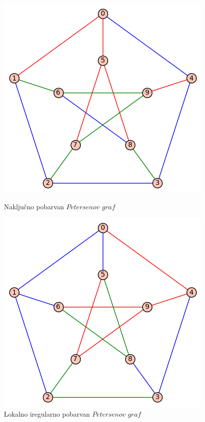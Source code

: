 \documentclass[12pt, a4paper]{article}
\begin{document}
\begin{figure}[H]
\begin{minipage}{0.5\textwidth}
  \centering
  \includegraphics[width=\linewidth]{petersen_pred.png}
  \captionsetup{width=0.75\textwidth}
  \caption{Naključno pobarvan $Petersenov$ $graf$}
  \label{fig:Peterson1}
\end{minipage}%
\begin{minipage}{0.5\textwidth}
  \centering
  \includegraphics[width=\linewidth]{petersen_po.png}
  \captionsetup{width=0.72\textwidth}
  \caption{Lokalno iregularno pobarvan $Petersenov$ $graf$}
  \label{fig:Peterson2}
\end{minipage}
\end{figure}
\end{document}
